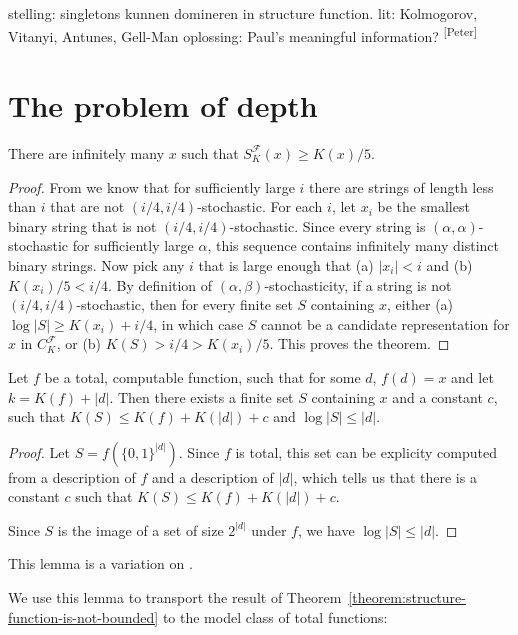 \documentclass{style/llncs}
\newcommand{\F}{\mathscr F}
\newcommand{\pb}[1]{\textcolor{OliveGreen}{\small #1 \textsuperscript{[Peter]} }}
\begin{document}
\pb{
stelling: singletons kunnen domineren in structure function.
lit: Kolmogorov, Vitanyi, Antunes, Gell-Man
oplossing: Paul's meaningful information?
}

\section{The problem of depth}

\begin{theorem}
There are infinitely many $x$ such that $S^\F_K(x) \geq K(x)/5$. \label{theorem:structure-function-is-not-bounded}
\end{theorem}
\begin{proof}
From \cite[Proposition~I.3 (b)]{gacs2001algorithmic} we know that for sufficiently large $i$ there are strings of length less than $i$ that are not $(i/4, i/4)$-stochastic. For each $i$, let $x_i$ be the smallest binary string that is not $(i/4, i/4)$-stochastic. Since every string is $(\alpha,\alpha)$-stochastic for sufficiently large $\alpha$, this sequence contains infinitely many distinct binary strings. Now pick any $i$ that is large enough that (a) $|x_i|<i$ and (b) $K(x_i)/5 < i/4$. By definition of $(\alpha,\beta)$-stochasticity, if a string is not $(i/4,i/4)$-stochastic, then for every finite set $S$ containing $x$, either (a) $\log|S|\ge K(x_i)+i/4$, in which case $S$ cannot be a candidate representation for $x$ in $C^\F_K$, or (b) $K(S)>i/4>K(x_i)/5$. This proves the theorem.
\end{proof}



\begin{lemma}
Let $f$ be a total, computable function, such that for some $d$, $f(d) = x$ and let $k = K(f) + |d|$. Then there exists a finite set $S$ containing $x$ and a constant $c$, such that $K(S) \leq K(f) + K(|d|) + c$ and $\log |S| \leq |d|$.\label{lemma:total-to-sets}
\end{lemma}
\begin{proof}
Let $S = f\left(\{0,1\}^{|d|}\right)$. Since $f$ is total, this set can be explicity computed from a description of $f$ and a description of $|d|$, which tells us that there is a constant $c$ such that $K(S) \leq K(f) + K(|d|) + c$. 

Since $S$ is the image of a set of size $2^{|d|}$ under $f$, we have $\log |S| \leq |d|$.
\end{proof}
This lemma is a variation on \cite[Lemma~7.2]{vitanyi2004meaningful}.

We use this lemma to transport the result of Theorem~\ref{theorem:structure-function-is-not-bounded} to the model class of total functions:
\end{document}
